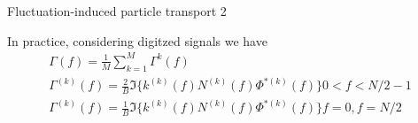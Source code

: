 \documentclass[t,10pt]{beamer}
\begin{document}
\begin{frame}{Fluctuation-induced particle transport 2}
\begin{itemize}
{\footnotesize
\item In practice, considering digitzed signals we have 
\begin{gather*}
\Gamma(f)=\frac{1}{M}\sum_{k=1}^{M}\Gamma^{k}(f) \\
\Gamma^{(k)}(f)=\frac{2}{B}\Im\{k^{(k)}(f)N^{(k)}(f)\Phi^{*(k)}(f)\}
 0<f<N/2-1 \\
\Gamma^{(k)}(f)=\frac{1}{B}\Im\{k^{(k)}(f)N^{(k)}(f)\Phi^{*(k)}(f)\}
 f=0,f=N/2
\end{gather*}
}



\end{itemize}
\end{frame}
\end{document}
